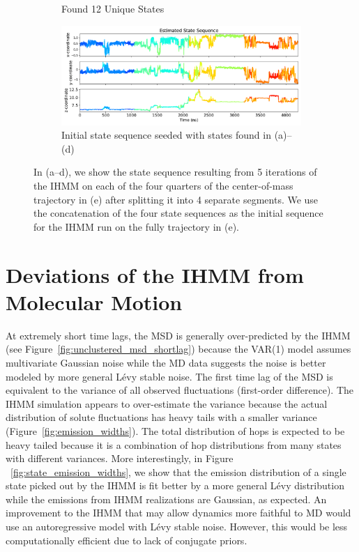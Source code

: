\documentclass{article}
\begin{document}
\begin{figure}
\begin{subfigure}{0.48\textwidth}
  \caption{Found 12 Unique States}\label{fig:segment4}
  \end{subfigure}
  \begin{subfigure}{1\textwidth}
  \includegraphics[width=\textwidth]{seed_ACH21_full.pdf}
  \caption{Initial state sequence seeded with states found in (a)--(d)}\label{fig:full}
  \end{subfigure}
  \caption{In (a--d), we show the state sequence resulting from 5 iterations
  of the IHMM on each of the four quarters of the center-of-mass trajectory in
  (e) after splitting it into 4 separate segments. We use the concatenation 
  of the four state sequences as the initial sequence for the IHMM run on the 
  fully trajectory in (e).
  }\label{fig:seed_sequence}
  \end{figure}
  
  \section{Deviations of the IHMM from Molecular Motion}\label{section:shorttimes_msd}
  
   At extremely short time lags, the MSD is generally over-predicted by the IHMM
  (see Figure~\ref{fig:unclustered_msd_shortlag}) because the VAR(1) model assumes
  multivariate Gaussian noise while the MD data suggests the noise is better 
  modeled by more general L\'evy stable noise. The first time lag of the MSD is
  equivalent to the variance of all observed fluctuations (first-order difference). 
  The IHMM simulation appears to over-estimate the variance because the actual 
  distribution of solute fluctuations has heavy tails with a smaller variance (Figure~\ref{fig:emission_widths}).
  The total distribution of hops is expected to be heavy tailed because it is a
  combination of hop distributions from many states with different variances. More
  interestingly, in Figure ~\ref{fig:state_emission_widths}, we show that the 
  emission distribution of a single state picked out by the IHMM is fit better by
  a more general L\'evy distribution while the emissions from IHMM realizations are
  Gaussian, as expected. An improvement to the IHMM that may allow dynamics more 
  faithful to MD would use an autoregressive model with L\'evy stable noise. However,
  this would be less computationally efficient due to lack of conjugate priors.
  
\end{document}
